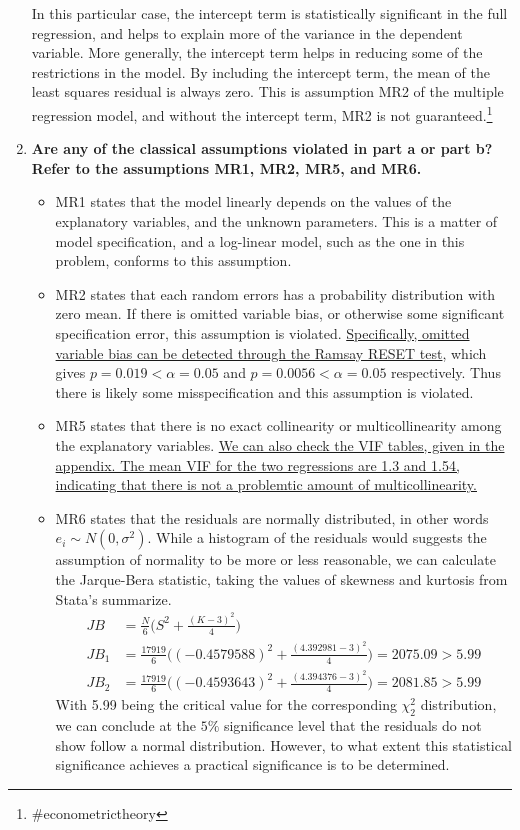 \documentclass{article}
\begin{document}
\begin{enumerate}[label=\alph*.]
In this particular case, the intercept term is statistically significant in the full regression, and helps to explain more of the variance in the dependent variable. More generally, the intercept term helps in reducing some of the restrictions in the model. By including the intercept term, the mean of the least squares residual is always zero. This is assumption MR2 of the multiple regression model, and without the intercept term, MR2 is not guaranteed.\footnote{\#econometrictheory}
\newpage
\item \textbf{Are any of the classical assumptions violated in part a or part b? Refer to the assumptions MR1, MR2, MR5, and MR6.} 
\begin{itemize}
	\item MR1 states that the model linearly depends on the values of the explanatory variables, and the unknown parameters. This is a matter of model specification, and a log-linear model, such as the one in this problem, conforms to this assumption. 
	\item MR2 states that each random errors has a probability distribution with zero mean. If there is omitted variable bias, or otherwise some significant specification error, this assumption is violated. \hyperlink{ramsay}{ Specifically, omitted variable bias can be detected through the Ramsay RESET test}, which gives $p =0.019<\alpha =0.05$ and $p=0.0056 < \alpha = 0.05$ respectively. Thus there is likely some misspecification and this assumption is violated.
	\item MR5 states that there is no exact collinearity or multicollinearity among the explanatory variables. \hyperlink{vif}{We can also check the VIF tables, given in the appendix. The mean VIF for the two regressions are 1.3 and 1.54, indicating that there is not a problemtic amount of multicollinearity.}
	\item MR6 states that the residuals are normally distributed, in other words $e_i  \sim N(0, \sigma^2)$. While a histogram of the residuals would suggests the assumption of normality to be more or less reasonable, we can calculate the Jarque-Bera statistic, taking the values of skewness and kurtosis from Stata's summarize. 
\begin{align*}
JB &= \frac{N}{6}\Big(	 S^2 + \frac{(K-3)^2}{4} \Big)		\\
JB_1 &= \frac{17919}{6}\Big((-0.4579588)^2 + \frac{(4.392981-3)^2}{4} \Big) = 2075.09>5.99\\
JB_2 &= \frac{17919}{6}\Big((-0.4593643)^2 + \frac{(4.394376-3)^2}{4} \Big) = 2081.85>5.99
\end{align*}
With 5.99 being the critical value for the corresponding $\chi_2^2$ distribution, we can conclude at the $5\%$ significance level that the residuals do not show follow a normal distribution. However, to what extent this statistical significance achieves a practical significance is to be determined.
\end{itemize}



\end{enumerate}
\end{document}
